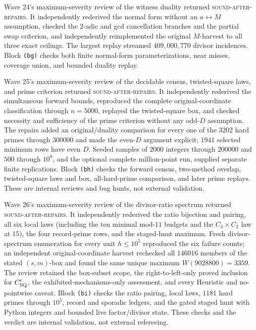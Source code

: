\documentclass[10pt,reqno]{amsart}
\theoremstyle{definition}
\newcommand{\1}{\mathbf 1}
\begin{document}
Wave 24's maximum-severity review of the witness duality returned
\textsc{sound-after-repairs}.  It independently rederived the normal form
without an $a\leftrightarrow M$ assumption, checked the $2$-adic and gcd
cancellation branches and the partial swap criterion, and independently
reimplemented the original $M$-harvest to all three exact ceilings.  The
largest replay streamed $409{,}000{,}770$ divisor incidences.  Block
\texttt{(bg)} checks both finite normal-form parameterizations, near misses,
coverage union, and bounded duality replay.

Wave 25's maximum-severity review of the decidable census, twisted-square
laws, and prime criterion returned \textsc{sound-after-repairs}.  It
independently rederived the simultaneous forward bounds, reproduced the
complete original-coordinate classification through $n=5000$, replayed the
twisted-square box, and checked necessity and sufficiency of the prime
criterion without any odd-$D$ assumption.  The repairs added an
original/duality comparison for every one of the $3202$ hard primes through
$300000$ and made the even-$D$ argument explicit; $1941$ selected minimum
rows have even $D$.  Seeded samples of $2000$ integers through $200000$ and
$500$ through $10^6$, and the optional complete million-point run, supplied
separate finite replications.  Block \texttt{(bh)} checks the forward census,
two-method overlap, twisted-square laws and box, all-hard-prime comparison,
and later prime replays.  These are internal reviews and bug hunts, not
external validation.

Wave 26's maximum-severity review of the divisor-ratio spectrum returned
\textsc{sound-after-repairs}.  It independently rederived the ratio
bijection and pairing, all six local laws (including the ten minimal
mod-$11$ budgets and the $C_4\times C_2$ law at $15$), the four record-prime
rows, and the staged-hunt maximum.  Fresh divisor-spectrum enumeration for
every unit $h\leq10^5$ reproduced the six failure counts; an independent
original-coordinate harvest rechecked all $146016$ members of the stated
$(s,m)$-box and found the same unique maximum $W(9028800)=3359$.  The review
retained the box-subset scope, the right-to-left-only proved inclusion for
$C_{\rm SQ}'$, the exhibited-mechanisms-only assessment, and every
Heuristic and no-pointwise caveat.  Block \texttt{(bi)} checks the ratio
pairing, local laws, $1181$ hard primes through $10^5$, record and sporadic
ledgers, and the gated staged hunt with Python integers and bounded live
factor/divisor state.  These checks and the verdict are internal
validation, not external refereeing.
\end{document}
